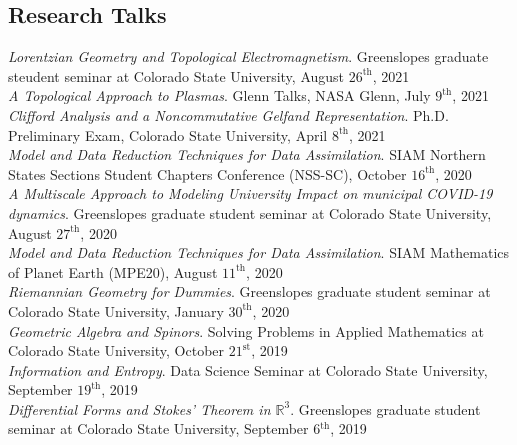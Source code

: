 \documentclass[12pt]{article} %
\begin{document}
\subsection{Research Talks}
\begin{flushleft}
    \emph{Lorentzian Geometry and Topological Electromagnetism}. Greenslopes graduate steudent seminar at Colorado State University, August $26^\textrm{th}$, 2021\\
	    \vspace*{5pt}
    \emph{A Topological Approach to Plasmas}. Glenn Talks, NASA Glenn, July $9^\textrm{th}$, 2021\\
	    \vspace*{5pt}
    \emph{Clifford Analysis and a Noncommutative Gelfand Representation}. Ph.D. Preliminary Exam, Colorado State University, April $8^\textrm{th}$, 2021\\
	    \vspace*{5pt}
    \emph{Model and Data Reduction Techniques for Data Assimilation}. SIAM Northern States Sections Student Chapters Conference (NSS-SC), October $16^\textrm{th}$, 2020\\
	    \vspace*{5pt}
    \emph{A Multiscale Approach to Modeling University Impact on municipal COVID-19 dynamics}. Greenslopes graduate student seminar at Colorado State University, August $27^\textrm{th}$, 2020\\
	    \vspace*{5pt}
    \emph{Model and Data Reduction Techniques for Data Assimilation}. SIAM Mathematics of Planet Earth (MPE20), August $11^\textrm{th}$, 2020\\
	    \vspace*{5pt}
	\emph{Riemannian Geometry for Dummies}. Greenslopes graduate student seminar at Colorado State University, January $30^\textrm{th}$, 2020\\
	    \vspace*{5pt}
    \emph{Geometric Algebra and Spinors}. Solving Problems in Applied Mathematics at Colorado State University, October $21^\textrm{st}$, 2019\\
    \vspace*{5pt}
    \emph{Information and Entropy}. Data Science Seminar at Colorado State University, September $19^{\textrm{th}}$, 2019
    \\
    \vspace*{5pt}
    \emph{Differential Forms and Stokes' Theorem in $\mathbb{R}^3$}. Greenslopes graduate student seminar at Colorado State University, September 6$^\textrm{th}$, 2019

\end{flushleft}
\end{document}

